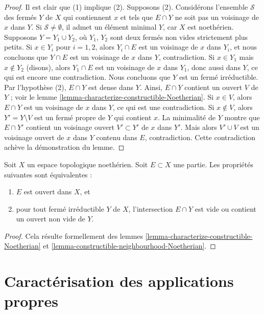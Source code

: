 \begin{proof}
Il est clair que (1) implique (2). Supposons (2).
Considérons l'ensemble $\mathcal{S}$ des fermés $Y$ de $X$ qui contiennent
$x$ et tels que $E \cap Y$ ne soit pas un voisinage de $x$ dans $Y$.
Si $\mathcal{S} \not = \emptyset$, il admet un élément minimal $Y$, car $X$
est noethérien. Supposons $Y = Y_1 \cup Y_2$, où $Y_1$, $Y_2$ sont deux
fermés non vides strictement plus petits. Si $x \in Y_i$ pour $i = 1, 2$,
alors $Y_i \cap E$ est un voisinage de $x$ dans $Y_i$, et nous concluons que
$Y \cap E$ est un voisinage de $x$ dans $Y$, contradiction. Si $x \in Y_1$
mais $x \not\in Y_2$ (disons), alors $Y_1 \cap E$ est un voisinage de $x$
dans $Y_1$, donc aussi dans $Y$, ce qui est encore une contradiction.
Nous concluons que $Y$ est un fermé irréductible. Par l'hypothèse (2),
$E \cap Y$ est dense dans $Y$. Ainsi, $E \cap Y$ contient un ouvert $V$ de
$Y$ ; voir le lemme \ref{lemma-characterize-constructible-Noetherian}.
Si $x \in V$, alors $E \cap Y$ est un voisinage de $x$ dans $Y$, ce qui est
une contradiction. Si $x \not \in V$, alors $Y' = Y \setminus V$ est un
fermé propre de $Y$ qui contient $x$. La minimalité de $Y$ montre que
$E \cap Y'$ contient un voisinage ouvert $V' \subset Y'$ de $x$ dans $Y'$.
Mais alors $V' \cup V$ est un voisinage ouvert de $x$ dans $Y$ contenu dans
$E$, contradiction.
Cette contradiction achève la démonstration du lemme.
\end{proof}

\begin{lemma}
\label{lemma-characterize-open-Noetherian}
Soit $X$ un espace topologique noethérien.
Soit $E \subset X$ une partie.
Les propriétés suivantes sont équivalentes :
\begin{enumerate}
\item $E$ est ouvert dans $X$, et
\item pour tout fermé irréductible $Y$ de $X$, l'intersection $E \cap Y$ est
vide ou contient un ouvert non vide de $Y$.
\end{enumerate}
\end{lemma}

\begin{proof}
Cela résulte formellement des
lemmes \ref{lemma-characterize-constructible-Noetherian} et
\ref{lemma-constructible-neighbourhood-Noetherian}.
\end{proof}





\section{Caractérisation des applications propres}
\label{section-proper}

